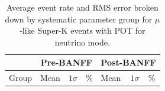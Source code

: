 \begin{table}[H]
	\centering
	\begin{tabular}{|l||l|l|l||l|l|l|}
		\hline
		& \multicolumn{3}{c||}{\textbf{Pre-BANFF}} & \multicolumn{3}{c|}{\textbf{Post-BANFF}} \\ \hline
		Group        & Mean       & $1\sigma$       & \%       & Mean        & $1\sigma$       & \%       \\ \hline\hline
		
		
		
		
		
		
		\hline
		
		
	\end{tabular}
	\caption
	{
	Average event rate and RMS error broken down by systematic parameter group for $\mu$-like Super-K events with \RunPeriod POT for neutrino mode.
	}
	\label{tab:sk_errors_1Rmu}
\end{table}